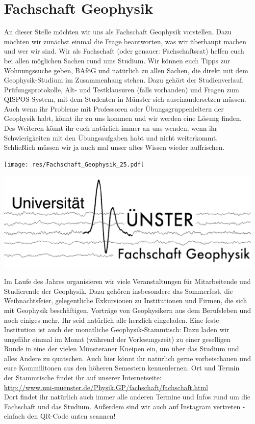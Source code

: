 \section{Fachschaft Geophysik}
\begin{multicols*}{2}
An dieser Stelle möchten wir uns als Fachschaft Geophysik vorstellen.
Dazu möchten wir zunächst einmal die Frage beantworten, was wir überhaupt machen und wer wir sind.
Wir als Fachschaft (oder genauer: Fachschaftsrat) helfen euch bei allen möglichen Sachen rund ums Studium.
Wir können euch Tipps zur Wohnungssuche geben, BAföG und natürlich zu allen Sachen, die direkt mit dem Geophysik-Studium im Zusammenhang stehen.
Dazu gehört der Studienverlauf, Prüfungsprotokolle, Alt- und Testklausuren (falls vorhanden) und Fragen zum QISPOS-System, mit dem Studenten in Münster sich auseinandersetzen müssen.
Auch wenn ihr Probleme mit Professoren oder Übungsgruppenleitern der Geophysik habt, könnt ihr zu uns kommen und wir werden eine Lösung finden.
Des Weiteren könnt ihr euch natürlich immer an uns wenden, wenn ihr Schwierigkeiten mit den Übungsaufgaben habt und nicht weiterkommt.
Schließlich müssen wir ja auch mal unser altes Wissen wieder auffrischen.

\begin{center}
	\texttt{[image: res/Fachschaft\_Geophysik\_25.pdf]}
	
	\includegraphics[width=0.8\columnwidth]{res/fs_geophysik_logo_neu.jpg}
\end{center}

Im Laufe des Jahres organisieren wir viele Veranstaltungen für Mitarbeitende und Studierende der Geophysik.
Dazu gehören insbesondere das Sommerfest, die Weihnachtsfeier, gelegentliche Exkursionen zu Institutionen und Firmen, die sich mit Geophysik beschäftigen, Vorträge von Geophysikern aus dem Berufsleben und noch einiges mehr.
Ihr seid natürlich alle herzlich eingeladen.
Eine feste Institution ist auch der monatliche Geophysik-Stammtisch:
Dazu laden wir ungefähr einmal im Monat (während der Vorlesungszeit) zu einer geselligen Runde in eine der vielen Münsteraner Kneipen ein, um über das Studium und alles Andere zu quatschen.
Auch hier könnt ihr natürlich gerne vorbeischauen und eure Kommilitonen aus den höheren Semestern kennenlernen.
Ort und Termin der Stammtische findet ihr auf unserer Internetseite:\\
\url{http://www.uni-muenster.de/Physik.GP/fachschaft/fachschaft.html}\\
Dort findet ihr natürlich auch immer alle anderen Termine und Infos rund um die Fachschaft und das Studium.
Außerdem sind wir auch auf Instagram vertreten - einfach den QR-Code unten scannen!


\end{multicols*}
